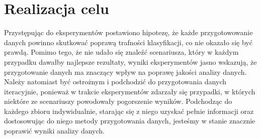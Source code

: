 \documentclass[oneside]{book}
\begin{document}
\section*{Realizacja celu}
Przystępując do eksperymentów postawiono hipotezę, że każde przygotowowanie danych powinno skutkować poprawą 
trafności klasyfikacji, co nie okazało się być prawdą. Pomimo tego, że nie udało się znaleźć scenariusza, 
który w każdym przypadku dawałby najlepsze rezultaty, wyniki eksperymentów jasno wskazują,
że przygotowanie danych ma znaczący wpływ na poprawę jakości analizy danych. 
Należy natomiast być ostrożnym i podchodzić do przygotowania danych iteracyjnie, 
ponieważ w trakcie eksperymentów zdarzały się przypadki, w których niektóre ze scenariuszy 
powodowały pogorszenie wyników. Podchodząc do każdego 
zbioru indywidualnie, starając się z niego uzyskać pełnie informacji oraz dostosowując do niego 
metody przygotowania danych, jesteśmy w stanie znacznie poprawić wyniki analizy danych.
\end{document}
